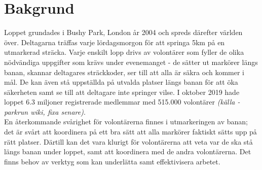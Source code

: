 \section{Bakgrund}


Loppet grundades i Bushy Park, London år 2004 och spreds därefter världen över. Deltagarna träffas varje lördagsmorgon för att springa 5km på en utmarkerad sträcka. Varje enskilt lopp drivs av volontärer som fyller de olika nödvändiga uppgifter som krävs under evenemanget - de sätter ut markörer längs banan, skannar deltagares sträckkoder, ser till att alla är säkra och kommer i mål. De kan även stå uppställda på utvalda platser längs banan för att öka säkerheten samt se till att deltagare inte springer vilse. I oktober 2019 hade loppet 6.3 miljoner registrerade medlemmar med 515.000 volontärer \textit{(källa - parkrun wiki, fixa senare)}. \\
En återkommande svårighet för volontärerna finnes i utmarkeringen av banan; det är svårt att koordinera på ett bra sätt att alla markörer faktiskt sätts upp på rätt platser. Därtill kan det vara klurigt för volontärerna att veta var de ska stå längs banan under loppet, samt att koordinera med de andra volontärerna. Det finns behov av verktyg som kan underlätta samt effektivisera arbetet.

